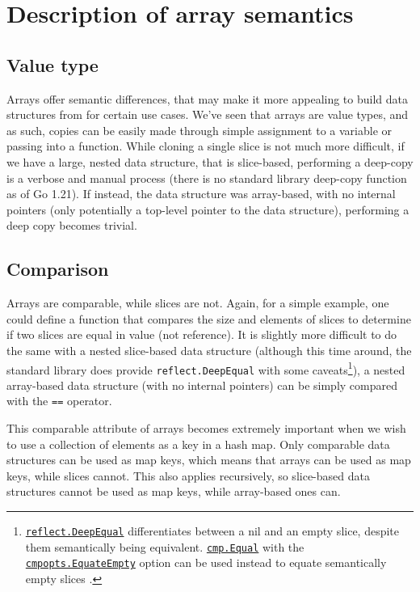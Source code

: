 \section{Description of array semantics}
\label{ch:arr-semantics-appx}

\subsection{Value type}

Arrays offer semantic differences, that may make it more appealing to
build data structures from for certain use cases. We've seen that arrays are
value types, and as such, copies can be easily made through simple assignment to
a variable or passing into a function. While cloning a single slice is not much
more difficult, if we have a large, nested data structure, that is slice-based,
performing a deep-copy is a verbose and manual process (there is no standard
library deep-copy function as of Go 1.21). If instead, the data structure was
array-based, with no internal pointers (only potentially a top-level pointer to
the data structure), performing a deep copy becomes trivial.

\subsection{Comparison}

Arrays are comparable, while slices are not. Again, for a simple example, one
could define a function that compares the size and elements of slices to
determine if two slices are equal in value (not reference). It is slightly more
difficult to do the same with a nested slice-based data structure (although this
time around, the standard library does provide \texttt{reflect.DeepEqual} with
some caveats\footnote{\href{https://pkg.go.dev/reflect\#DeepEqual}{\texttt{reflect.DeepEqual}} differentiates between a nil
    and an empty slice, despite them semantically being equivalent.
    \href{https://pkg.go.dev/github.com/google/go-cmp/cmp\#Equal}{\texttt{cmp.Equal}}
    with the
    \href{https://pkg.go.dev/github.com/google/go-cmp/cmp/cmpopts\#EquateEmpty}{\texttt{cmpopts.EquateEmpty}}
    option can be used instead to equate semantically empty slices
    \autocite{deepEqual}.}), a nested array-based data structure (with no internal
pointers) can be simply compared with the \texttt{==} operator.

This comparable attribute of arrays becomes extremely important when we wish to
use a collection of elements as a key in a hash map. Only comparable data
structures can be used as map keys, which means that arrays can be used as map
keys, while slices cannot. This also applies recursively, so slice-based data
structures cannot be used as map keys, while array-based ones can.
